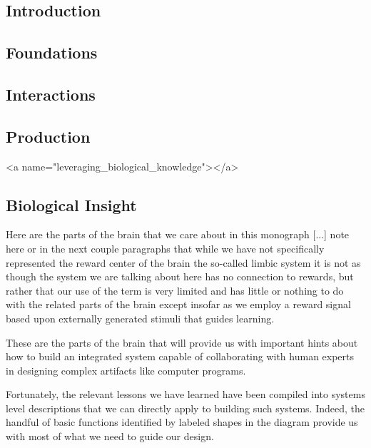 
\subsection*{Introduction}
\subsection*{Foundations}
\subsection*{Interactions}
\subsection*{Production}


\rawhtml
<a name="leveraging_biological_knowledge"></a>
\endrawhtml
\subsection*{Biological Insight}


Here are the parts of the brain that we care about in this monograph [...] note here or in the next couple paragraphs that while we have not specifically represented the reward center of the brain \emdash{} the so-called limbic system \emdash{} it is not as though the system we are talking about here has no connection to rewards, but rather that our use of the term is very limited and has little or nothing to do with the related parts of the brain except insofar as we employ a reward signal based upon externally generated stimuli that guides learning.

These are the parts of the brain that will provide us with important hints about how to build an integrated system capable of collaborating with human experts in designing complex artifacts like computer programs.

Fortunately, the relevant lessons we have learned have been compiled into systems level descriptions that we can directly apply to building such systems. Indeed, the handful of basic functions identified by labeled shapes in the diagram provide us with most of what we need to guide our design.

